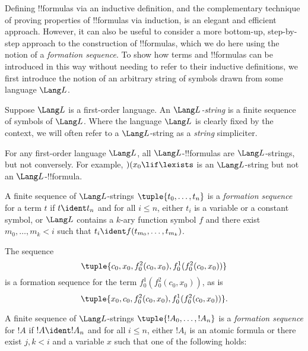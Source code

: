 \documentclass[../../../include/open-logic-section]{subfiles}
\begin{document}


Defining !!{formula}s via an inductive definition, and the
complementary technique of proving properties of !!{formula}s via
induction, is an elegant and efficient approach. However, it can
also be useful to consider a more bottom-up, step-by-step approach
to the construction of !!{formula}s, which we do here using the
notion of a \emph{formation sequence}.
%
To show how terms and !!{formula}s can be introduced in this way
without needing to refer to their inductive definitions, we first
introduce the notion of an arbitrary string of symbols drawn from
some language $\Lang L$.

\begin{defn}[Strings]
Suppose $\Lang L$ is a first-order language.
An \emph{$\Lang L$-string} is a finite sequence of symbols of
$\Lang L$. Where the language $\Lang L$ is clearly fixed by the
context, we will often refer to a $\Lang L$-string as a
\emph{string} simpliciter.
\end{defn}

\begin{ex}
For any first-order language $\Lang L$, all
$\Lang L$-!!{formula}s are $\Lang L$-strings, but not
conversely. For example, $)(x_0\lif\lexists$ is an
$\Lang L$-string but not an $\Lang L$-!!{formula}.
\end{ex}

\begin{defn}
A finite sequence of $\Lang L$-strings $\tuple{t_0,\dotsc,t_n}$
is a \emph{formation sequence} for a term $t$
if $t \ident t_n$ and for all $i \leq n$, either $t_i$ is a
variable or a constant symbol, or $\Lang L$ contains a $k$-ary
function symbol $f$ and there exist $m_0,\dotsc,m_k < i$
such that $t_i \ident f(t_{m_0},\dotsc,t_{m_k})$.
\end{defn}

\begin{ex}
The sequence
\[
    \tuple{c_0,x_0,f^2_0(c_0,x_0),f^1_0(f^2_0(c_0,x_0))}
\]
is a formation sequence for the term $f^1_0(f^2_0(c_0,x_0))$, as is
\[
    \tuple{x_0,c_0,f^2_0(c_0,x_0),f^1_0(f^2_0(c_0,x_0))}.
\]
\end{ex}

\begin{defn}
A finite sequence of $\Lang L$-strings $\tuple{!A_0,\dotsc,!A_n}$
is a \emph{formation sequence} for $!A$ if $!A \ident !A_n$ and
for all $i \leq n$, either $!A_i$ is an atomic formula or there
exist $j,k < i$ and a variable $x$ such that one of the following
holds:
\begin{enumerate}
\end{enumerate}
\end{defn}
\end{document}

